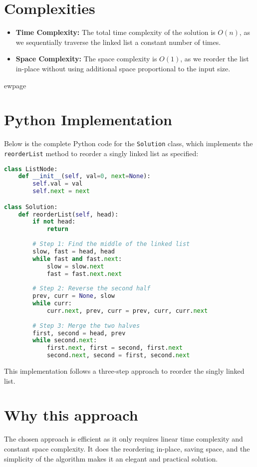 \section*{Complexities}
\begin{itemize}
    \item \textbf{Time Complexity:} The total time complexity of the solution is \(O(n)\), as we sequentially traverse the linked list a constant number of times.
    \item \textbf{Space Complexity:} The space complexity is \(O(1)\), as we reorder the list in-place without using additional space proportional to the input size.
\end{itemize}


ewpage
\section*{Python Implementation}
Below is the complete Python code for the \texttt{Solution} class, which implements the \texttt{reorderList} method to reorder a singly linked list as specified:

\begin{fullwidth}
\begin{lstlisting}[language=Python]
class ListNode:
    def __init__(self, val=0, next=None):
        self.val = val
        self.next = next

class Solution:
    def reorderList(self, head):
        if not head:
            return
        
        # Step 1: Find the middle of the linked list
        slow, fast = head, head
        while fast and fast.next:
            slow = slow.next
            fast = fast.next.next
        
        # Step 2: Reverse the second half
        prev, curr = None, slow
        while curr:
            curr.next, prev, curr = prev, curr, curr.next
        
        # Step 3: Merge the two halves
        first, second = head, prev
        while second.next:
            first.next, first = second, first.next
            second.next, second = first, second.next
\end{lstlisting}

\end{fullwidth}

This implementation follows a three-step approach to reorder the singly linked list.

\section*{Why this approach}
The chosen approach is efficient as it only requires linear time complexity and constant space complexity. It does the reordering in-place, saving space, and the simplicity of the algorithm makes it an elegant and practical solution.

